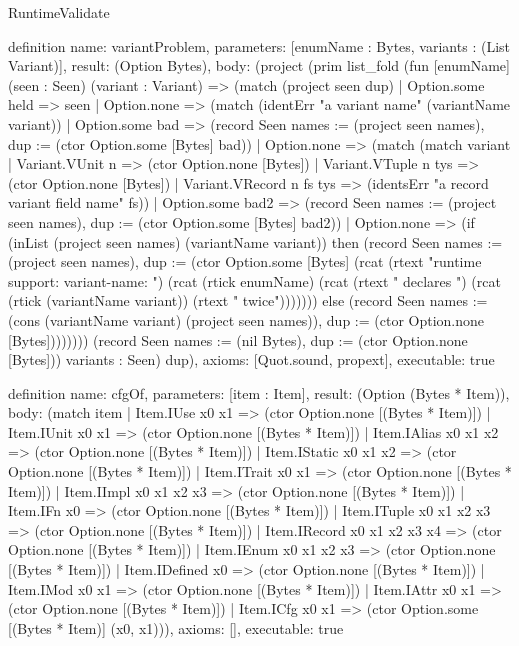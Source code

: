 \begin{lexlean}{RuntimeValidate}
\begin{semanticmodule}
definition{
  name: variantProblem,
  parameters: [enumName : Bytes, variants : (List Variant)],
  result: (Option Bytes),
  body: (project (prim list_fold (fun [enumName] (seen : Seen) (variant : Variant) => (match (project seen dup)
    | Option.some held => seen
    | Option.none => (match (identErr "a variant name" (variantName variant))
      | Option.some bad => (record Seen {names := (project seen names), dup := (ctor Option.some [Bytes] bad)})
      | Option.none => (match (match variant
          | Variant.VUnit n => (ctor Option.none [Bytes])
          | Variant.VTuple n tys => (ctor Option.none [Bytes])
          | Variant.VRecord n fs tys => (identsErr "a record variant field name" fs))
        | Option.some bad2 => (record Seen {names := (project seen names), dup := (ctor Option.some [Bytes] bad2)})
        | Option.none => (if (inList (project seen names) (variantName variant)) then (record Seen {names := (project seen names), dup := (ctor Option.some [Bytes] (rcat (rtext "runtime support: variant-name: ") (rcat (rtick enumName) (rcat (rtext " declares ") (rcat (rtick (variantName variant)) (rtext " twice"))))))}) else (record Seen {names := (cons (variantName variant) (project seen names)), dup := (ctor Option.none [Bytes])})))))) (record Seen {names := (nil Bytes), dup := (ctor Option.none [Bytes])}) variants : Seen) dup),
  axioms: [Quot.sound, propext],
  executable: true
}

definition{
  name: cfgOf,
  parameters: [item : Item],
  result: (Option (Bytes * Item)),
  body: (match item
    | Item.IUse x0 x1 => (ctor Option.none [(Bytes * Item)])
    | Item.IUnit x0 x1 => (ctor Option.none [(Bytes * Item)])
    | Item.IAlias x0 x1 x2 => (ctor Option.none [(Bytes * Item)])
    | Item.IStatic x0 x1 x2 => (ctor Option.none [(Bytes * Item)])
    | Item.ITrait x0 x1 => (ctor Option.none [(Bytes * Item)])
    | Item.IImpl x0 x1 x2 x3 => (ctor Option.none [(Bytes * Item)])
    | Item.IFn x0 => (ctor Option.none [(Bytes * Item)])
    | Item.ITuple x0 x1 x2 x3 => (ctor Option.none [(Bytes * Item)])
    | Item.IRecord x0 x1 x2 x3 x4 => (ctor Option.none [(Bytes * Item)])
    | Item.IEnum x0 x1 x2 x3 => (ctor Option.none [(Bytes * Item)])
    | Item.IDefined x0 => (ctor Option.none [(Bytes * Item)])
    | Item.IMod x0 x1 => (ctor Option.none [(Bytes * Item)])
    | Item.IAttr x0 x1 => (ctor Option.none [(Bytes * Item)])
    | Item.ICfg x0 x1 => (ctor Option.some [(Bytes * Item)] (x0, x1))),
  axioms: [],
  executable: true
}


\end{semanticmodule}
\end{lexlean}
